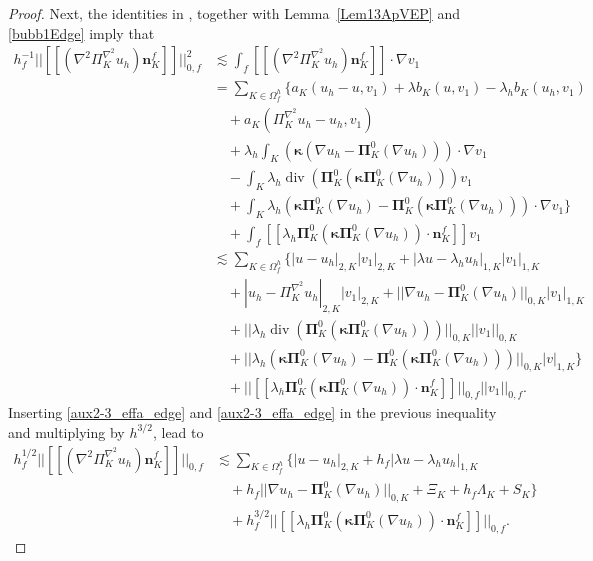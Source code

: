 \documentclass[final,reqno]{elsarticle}
\newcommand\vdiv{\mathop{\mathrm{div}}\nolimits}
\newcommand{\jump}[1]{[\![#1]\!]}
\def\bn{\boldsymbol{n}}
\def\bkappa{\boldsymbol{\kappa}}
\def\bPi{\mathbf{\Pi}}
\begin{document}
\begin{proof}
Next, the identities in \cite[(22)-(24)]{dassi2025posteriorierrorestimatesc1}, together with Lemma~\ref{Lem13ApVEP} and \eqref{bubb1Edge} imply that
\begin{align*}
h^{-1}_f||[\![(\nabla^2\Pi_K^{\nabla^2} u_h )\boldsymbol{n}_K^{f}]\!]||_{0,f}^2 &\lesssim 
\int_f [\![(\nabla^2\Pi_K^{\nabla^2} u_h )\boldsymbol{n}_K^{f}]\!]\cdot \nabla v_1\nonumber\\
&= \sum_{K\in \Omega^h_f} \bigg\{ a_K(u_h-u,v_1) + \lambda b_K(u,v_1)-\lambda_h b_K(u_h,v_1) \nonumber\\
&\quad + a_K(\Pi_K^{\nabla^2} u_h-u_h,v_1) \\
&\quad + \lambda_h \int_K (\bkappa(\nabla u_h - \bPi_K^0 (\nabla u_h)))\cdot \nabla v_1 \nonumber\\
&\quad - \int_{K}\lambda_h \vdiv\left( \bPi_K^0 (\bkappa \bPi_K^0(\nabla u_h))\right) v_1 \\
&\quad + \int_K \lambda_h \left(\bkappa \bPi_K^0(\nabla u_h)-\bPi_K^0(\bkappa \bPi_K^0(\nabla u_h))\right) \cdot \nabla v_1\bigg\} \nonumber \\
&\quad + \int_f \jump{\lambda_h\bPi_K^0(\bkappa \bPi_K^0(\nabla u_h ))\cdot \bn_K^{f}}v_1 \\
&\lesssim  \sum\limits_{K\in \Omega^h_f}\Bigg\{ |u-u_h|_{2,K}|v_1|_{2,K}+ |\lambda u -\lambda_h u_h |_{1,K}|v_1|_{1,K} \\
&\quad + |u_h-\Pi_K^{\nabla^2} u_h|_{2,K}|v_1|_{2,K} + ||\nabla u_h - \bPi_K^0 (\nabla u_h)||_{0,K}|v_1|_{1,K}\nonumber \\
&\quad +|| \lambda_h \vdiv\left( \bPi_K^0 (\bkappa \bPi_K^0(\nabla u_h))\right) ||_{0,K}|| v_1||_{0,K} \nonumber\\
&\quad + ||\lambda_h \left(\bkappa \bPi_K^0(\nabla u_h)-\bPi_K^0(\bkappa \bPi_K^0(\nabla u_h))\right) ||_{0,K}|v|_{1,K} \bigg\} \nonumber\\
&\quad + ||\jump{\lambda_h\bPi_K^0(\bkappa \bPi_K^0(\nabla u_h ))\cdot \bn_K^{f}}||_{0,f} ||v_1||_{0,f}.
\end{align*}
Inserting \eqref{aux2-3_effa_edge} and \eqref{aux2-3_effa_edge} in the previous inequality and multiplying by $h^{3/2}$, lead to
\begin{align}
    h^{1/2}_f||[\![(\nabla^2\Pi_K^{\nabla^2} u_h )\boldsymbol{n}_K^{f}]\!]||_{0,f} &\lesssim \sum\limits_{K\in \Omega^h_f}\Bigg\{ |u-u_h|_{2,K} + h_f|\lambda u -\lambda_h u_h |_{1,K} \nonumber\\
    &\quad + h_f||\nabla u_h - \bPi_K^0 (\nabla u_h)||_{0,K} + \Xi_K + h_f\Lambda_K + S_K \bigg\} \nonumber\\
    &\quad + h_f^{3/2}||\jump{\lambda_h\bPi_K^0(\bkappa \bPi_K^0(\nabla u_h ))\cdot \bn_K^{f}}||_{0,f}. \label{first_part_jump_eff}
\end{align}


\end{proof}
\end{document}
